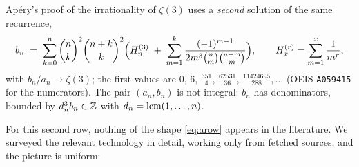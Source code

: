 Ap\'ery's proof of the irrationality of $\zeta(3)$ uses a \emph{second} solution of the
same recurrence,
\begin{equation}\label{eq:apery-b}
  b_n \;=\; \sum_{k=0}^n \binom{n}{k}^2\binom{n+k}{k}^2
     \Bigl(H^{(3)}_{n} \;+\; \sum_{m=1}^{k}
       \frac{(-1)^{m-1}}{2m^3\binom{n}{m}\binom{n+m}{m}}\Bigr),
  \qquad H^{(r)}_{x}=\sum_{m=1}^{x}\frac1{m^r},
\end{equation}
with $b_n/a_n\to\zeta(3)$; the first values are
$0,\,6,\,\tfrac{351}{4},\,\tfrac{62531}{36},\,\tfrac{11424695}{288},\dots$
(OEIS \texttt{A059415} for the numerators). The pair $(a_n,b_n)$ is not integral: $b_n$
has denominators, bounded by $d_n^3b_n\in\mathbb{Z}$ with $d_n=\operatorname{lcm}(1,\dots,n)$.

For this second row, nothing of the shape \eqref{eq:arow} appears in the literature. We
surveyed the relevant technology in detail, working only from fetched sources, and the
picture is uniform:

